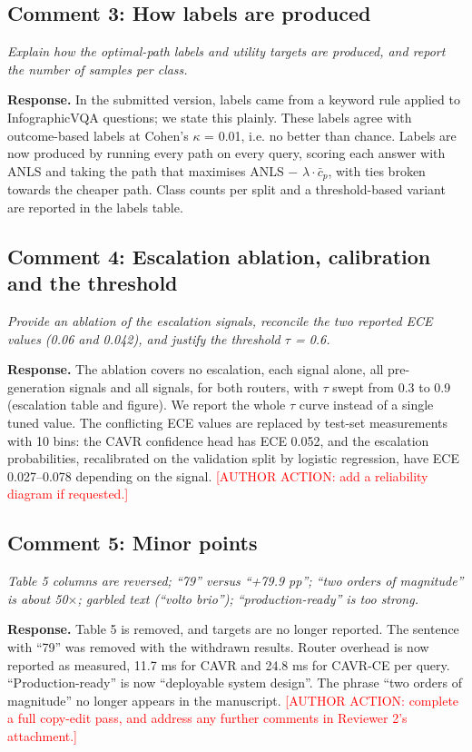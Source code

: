 \documentclass[11pt]{article}
\newcommand{\reviewer}[1]{{\color{blue!55!black}\itshape #1\par}}
\begin{document}
\subsection*{Comment 3: How labels are produced}
\reviewer{Explain how the optimal-path labels and utility targets are produced, and report the number of samples per class.}
\textbf{Response.} In the submitted version, labels came from a keyword rule applied to InfographicVQA questions; we state this plainly. These labels agree with outcome-based labels at Cohen's $\kappa$ = 0.01, i.e. no better than chance. Labels are now produced by running every path on every query, scoring each answer with ANLS and taking the path that maximises ANLS $-$ $\lambda\cdot\bar{c}_p$, with ties broken towards the cheaper path. Class counts per split and a threshold-based variant are reported in the labels table.

\subsection*{Comment 4: Escalation ablation, calibration and the threshold}
\reviewer{Provide an ablation of the escalation signals, reconcile the two reported ECE values (0.06 and 0.042), and justify the threshold $\tau$ = 0.6.}
\textbf{Response.} The ablation covers no escalation, each signal alone, all pre-generation signals and all signals, for both routers, with $\tau$ swept from 0.3 to 0.9 (escalation table and figure). We report the whole $\tau$ curve instead of a single tuned value. The conflicting ECE values are replaced by test-set measurements with 10 bins: the CAVR confidence head has ECE 0.052, and the escalation probabilities, recalibrated on the validation split by logistic regression, have ECE 0.027--0.078 depending on the signal. \textcolor{red}{[AUTHOR ACTION: add a reliability diagram if requested.]}

\subsection*{Comment 5: Minor points}
\reviewer{Table 5 columns are reversed; ``79'' versus ``+79.9 pp''; ``two orders of magnitude'' is about 50$\times$; garbled text (``volto brio''); ``production-ready'' is too strong.}
\textbf{Response.} Table 5 is removed, and targets are no longer reported. The sentence with ``79'' was removed with the withdrawn results. Router overhead is now reported as measured, 11.7 ms for CAVR and 24.8 ms for CAVR-CE per query. ``Production-ready'' is now ``deployable system design''. The phrase ``two orders of magnitude'' no longer appears in the manuscript. \textcolor{red}{[AUTHOR ACTION: complete a full copy-edit pass, and address any further comments in Reviewer 2's attachment.]}
\end{document}
